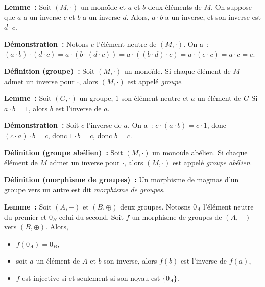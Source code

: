 \noindent\textbf{Lemme :} Soit $(M,\cdot)$ un monoïde et $a$ et $b$ deux éléments de $M$.
    On suppose que $a$ a un inverse $c$ et $b$ a un inverse $d$. 
    Alors, $a \cdot b$ a un inverse, et son inverse est $d \cdot c$.

\medskip

\noindent\textbf{Démonstration :} 
    Notons $e$ l'élément neutre de $(M, \cdot)$.
    On a : $(a \cdot b) \cdot (d \cdot c) = a \cdot (b \cdot (d \cdot c)) = a \cdot ((b \cdot d) \cdot c) = a \cdot (e \cdot c) = a \cdot c = e$.

    \done

\medskip

\noindent\textbf{Définition (groupe) :} Soit $(M,\cdot)$ un monoïde. 
    Si chaque élément de $M$ admet un inverse pour $\cdot$, alors $(M,\cdot)$ est appelé \textit{groupe}.

\medskip

\noindent\textbf{Lemme :} Soit $(G, \cdot)$ un groupe, $1$ son élément neutre et $a$ un élément de $G$
    Si $a \cdot b = 1$, alors $b$ est l'inverse de $a$.

\medskip

\noindent\textbf{Démonstration :}
    Soit $c$ l'inverse de $a$.
    On a : $c \cdot (a \cdot b) = c \cdot 1$, donc $(c \cdot a) \cdot b = c$, donc $1 \cdot b = c$, donc $b = c$.

    \done

\medskip

\noindent\textbf{Définition (groupe abélien) :} Soit $(M,\cdot)$ un monoïde abélien. 
    Si chaque élément de $M$ admet un inverse pour $\cdot$, alors $(M,\cdot)$ est appelé \textit{groupe abélien}.

\medskip

\noindent\textbf{Définition (morphisme de groupes) :} Un morphisme de magmas d'un groupe vers un autre est dit \textit{morphisme de groupes}.

\medskip

\noindent\textbf{Lemme :} Soit $(A, +)$ et $(B, \oplus)$ deux groupes. 
    Notosns $0_A$ l'élément neutre du premier et $0_B$ celui du second. 
    Soit $f$ un morphisme de groupes de $(A, +)$ vers $(B, \oplus)$.
    Alors, 
    \begin{itemize}[nosep]
        \item $f(0_A) = 0_B$,
        \item soit $a$ un élément de $A$ et $b$ son inverse, alors $f(b)$ est l'inverse de $f(a)$, 
        \item $f$ est injective si et seulement si son noyau est $\lbrace 0_A \rbrace$.
    \end{itemize}

